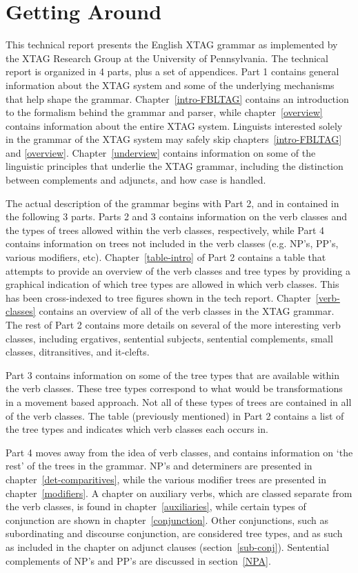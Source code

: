 \chapter{Getting Around}

This technical report presents the English XTAG grammar as implemented by the
XTAG Research Group at the University of Pennsylvania.  The technical report is
organized in 4 parts, plus a set of appendices.  Part 1 contains general
information about the XTAG system and some of the underlying mechanisms that
help shape the grammar.  Chapter~\ref{intro-FBLTAG} contains an introduction to
the formalism behind the grammar and parser, while chapter~\ref{overview}
contains information about the entire XTAG system.  Linguists interested solely
in the grammar of the XTAG system may safely skip chapters~\ref{intro-FBLTAG}
and \ref{overview}.  Chapter~\ref{underview} contains information on some of
the linguistic principles that underlie the XTAG grammar, including the
distinction between complements and adjuncts, and how case is handled.

The actual description of the grammar begins with Part 2, and in contained in
the following 3 parts.  Parts 2 and 3 contains information on the verb classes
and the types of trees allowed within the verb classes, respectively, while
Part 4 contains information on trees not included in the verb classes (e.g.
NP's, PP's, various modifiers, etc).  Chapter~\ref{table-intro} of Part 2
contains a table that attempts to provide an overview of the verb classes and
tree types by providing a graphical indication of which tree types are allowed
in which verb classes.  This has been cross-indexed to tree figures shown in
the tech report.  Chapter~\ref{verb-classes} contains an overview of all of the
verb classes in the XTAG grammar.  The rest of Part 2 contains more details on
several of the more interesting verb classes, including ergatives, sentential
subjects, sentential complements, small classes, ditransitives, and it-clefts.

Part 3 contains information on some of the tree types that are available within
the verb classes.  These tree types correspond to what would be transformations
in a movement based approach.  Not all of these types of trees are contained in
all of the verb classes.  The table (previously mentioned) in Part 2 contains a
list of the tree types and indicates which verb classes each occurs in.  

Part 4 moves away from the idea of verb classes, and contains information on
`the rest' of the trees in the grammar.  NP's and determiners are presented in
chapter~\ref{det-comparitives}, while the various modifier trees are presented
in chapter~\ref{modifiers}.  A chapter on auxiliary verbs, which are classed
separate from the verb classes, is found in chapter~\ref{auxiliaries}, while
certain types of conjunction are shown in chapter~\ref{conjunction}.  Other
conjunctions, such as subordinating and discourse conjunction, are considered
tree types, and as such as included in the chapter on adjunct clauses
(section~\ref{sub-conj}).  Sentential complements of NP's and PP's are
discussed in section~\ref{NPA}.


